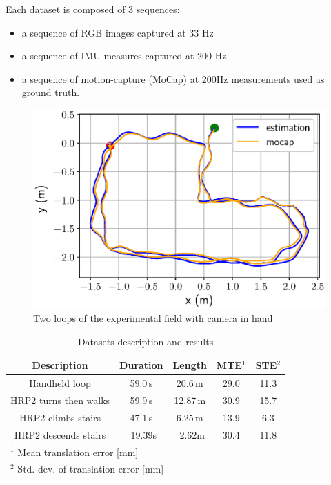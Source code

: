 Each dataset is composed of 3 sequences:
\begin{itemize}
    \item a sequence of RGB images captured at 33 Hz
    \item a sequence of IMU measures captured at 200 Hz
    \item a sequence of motion-capture (MoCap) at 200Hz measurements used as ground truth.
\end{itemize}


\begin{figure}[t]
    \centering
    \includegraphics[scale=0.8]{figures/absolute/xy_loop_twice.eps}
    \caption{Two loops of the experimental field with camera in hand}
    \label{fig:xy_loop_twice}
\end{figure}

%
\begin{table}[t]
    \centering
    \caption{Datasets description and results}
    \begin{tabular}{c|c|c|c|c}
        Description & Duration & Length & MTE$^1$ & STE$^2$ \\
        \hline
        \hline
        Handheld loop & 59.0\,\textrm{s} & 20.6\,\textrm{m} & 29.0 & 11.3  \\
        \hline
        HRP2 turns then walks & 59.9\,\textrm{s} & 12.87\,\textrm{m} & 30.9 & 15.7 \\
        \hline
        HRP2 climbs stairs & 47.1\,\textrm{s} & 6.25\,\textrm{m} & 13.9 & 6.3 \\
        \hline
        HRP2 descends stairs & \, 19.39\textrm{s} & \, 2.62\textrm{m} & 30.4 & 11.8 \\
        \hline
        \multicolumn{5}{l}{$^1$ Mean translation error [mm]} \\
        \multicolumn{5}{l}{$^2$ Std. dev. of translation error [mm]} 
    \end{tabular}
    \label{tab:datasets}
\end{table}


